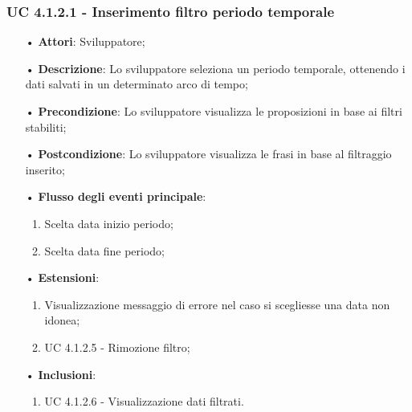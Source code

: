 \subsubsection{UC 4.1.2.1 - Inserimento filtro periodo temporale}
\begin{itemize}
\item[•]\textbf{Attori}: Sviluppatore;
\item[•]\textbf{Descrizione}: Lo sviluppatore seleziona un periodo temporale, ottenendo i dati salvati in un determinato arco di tempo;
\item[•]\textbf{Precondizione}: Lo sviluppatore visualizza le proposizioni in base ai filtri stabiliti;
\item[•]\textbf{Postcondizione}: Lo sviluppatore visualizza le frasi in base al filtraggio inserito;
\item[•]\textbf{Flusso degli eventi principale}: 
\begin{enumerate}
\item Scelta data inizio periodo;
\item Scelta data fine periodo;
\end{enumerate}
\item[•]\textbf{Estensioni}: 
\begin{enumerate}
	\item Visualizzazione messaggio di errore nel caso si scegliesse una data non idonea;
	\item UC 4.1.2.5 - Rimozione filtro;
\end{enumerate}
\item[•]\textbf{Inclusioni}:
\begin{enumerate}
\item UC 4.1.2.6 - Visualizzazione dati filtrati.
\end{enumerate}
\end{itemize}

